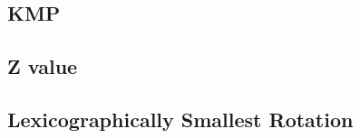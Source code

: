 \documentclass[a4paper,10pt,twocolumn,oneside]{article}
\begin{document}
\subsection{KMP}


\subsection{Z value}


%

%

\subsection{Lexicographically Smallest Rotation}


%

%

%

%
\end{document}
